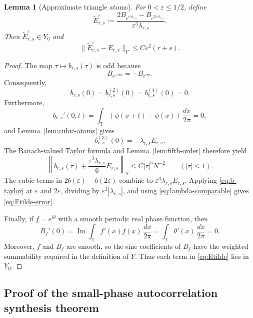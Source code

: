 \documentclass[10pt,a4paper]{amsart}
\newtheorem{lemma}[theorem]{Lemma}
\newcommand{\T}{\mathbb T}
\begin{document}
\begin{lemma}[Approximate triangle atoms]\label{lem:approx-atoms}
For $0<\varepsilon\leq1/2$, define
\begin{equation}\label{eq:Etilde}
 \widetilde E_{r,s}^{\varepsilon}
 :=\frac{2B_{e^{i\varepsilon\phi_{r,s}}}
 -B_{e^{2i\varepsilon\phi_{r,s}}}}
 {\varepsilon^3\lambda_{r,s}}.
\end{equation}
Then $\widetilde E_{r,s}^{\varepsilon}\in Y_0$ and
\begin{equation}\label{eq:Etilde-error}
 \|\widetilde E_{r,s}^{\varepsilon}-E_{r,s}\|_Y
 \leq C\varepsilon^2(r+s).
\end{equation}
\end{lemma}

\begin{proof}
The map $\tau\mapsto b_{r,s}(\tau)$ is odd because
\[
 B_{e^{-i\tau\phi}}=-B_{e^{i\tau\phi}}.
\]
Consequently,
\[
 b_{r,s}(0)=b_{r,s}^{(2)}(0)=b_{r,s}^{(4)}(0)=0.
\]
Furthermore,
\[
 b_{r,s}'(0,t)
 =\int_\T(\phi(x+t)-\phi(x))\,\frac{dx}{2\pi}=0,
\]
and Lemma~\ref{lem:cubic-atoms} gives
\[
 b_{r,s}^{(3)}(0)=-\lambda_{r,s}E_{r,s}.
\]
The Banach-valued Taylor formula and Lemma~\ref{lem:fifth-order} therefore yield
\begin{equation}\label{eq:b-taylor}
 \left\|b_{r,s}(\tau)
 +\frac{\tau^3\lambda_{r,s}}6E_{r,s}\right\|_Y
 \leq C|\tau|^5N^{-2}
 \qquad(|\tau|\leq1).
\end{equation}
The cubic terms in $2b(\varepsilon)-b(2\varepsilon)$ combine to $\varepsilon^3\lambda_{r,s}E_{r,s}$.  Applying \eqref{eq:b-taylor} at $\varepsilon$ and $2\varepsilon$, dividing by $\varepsilon^3|\lambda_{r,s}|$, and using \eqref{eq:lambda-comparable} gives \eqref{eq:Etilde-error}.

Finally, if $f=e^{i\theta}$ with a smooth periodic real phase function, then
\[
 B_f'(0)=\operatorname{Im}\int_\T f'(x)\overline{f(x)}\,\frac{dx}{2\pi}
 =\int_\T\theta'(x)\,\frac{dx}{2\pi}=0.
\]
Moreover, $f$ and $B_f$ are smooth, so the sine coefficients of $B_f$ have
the weighted summability required in the definition of $Y$. Thus each term
in \eqref{eq:Etilde} lies in $Y_0$.
\end{proof}


\subsection{Proof of the small-phase autocorrelation synthesis theorem}
\end{document}
